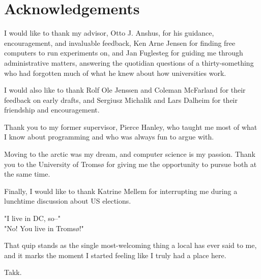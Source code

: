 \chapter{Acknowledgements}

I would like to thank my advisor, Otto J. Anshus, for his guidance,
encouragement, and invaluable feedback, Ken Arne Jensen for finding free
computers to run experiments on, and Jan Fuglesteg for guiding me through
administrative matters, answering the quotidian questions of a thirty-something
who had forgotten much of what he knew about how universities work.

I would also like to thank Rolf Ole Jenssen and Coleman McFarland for their
feedback on early drafts, and Sergiusz Michalik and Lars Dalheim for their
friendship and encouragement.

Thank you to my former supervisor, Pierce Hanley, who taught me most of what I
know about programming and who was always fun to argue with.

Moving to the arctic was my dream, and computer science is my passion.
Thank you to the University of Tromsø for giving me the opportunity to pursue
both at the same time.

Finally, I would like to thank Katrine Mellem for interrupting me during a
lunchtime discussion about US elections.

"I live in DC, so--"\\
"No! You live in Tromsø!"

That quip stands as the single most-welcoming thing a local has ever said to me,
and it marks the moment I started feeling like I truly had a place here.

Takk.
